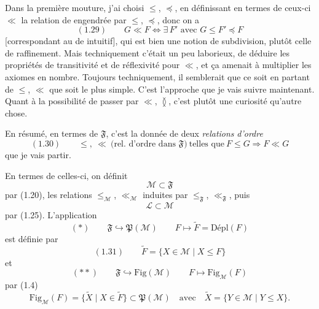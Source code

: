 \documentclass[11pt,a4paper]{article}
\begin{document}
Dans la première mouture, j'ai choisi $\leq$, $\preccurlyeq$, en définissant en termes de ceux-ci $\ll$  la relation de  engendrée par $\leq$, $\preccurlyeq$, donc on a
\[
  (1.29) \qquad G \ll F \iff \exists\, F' \text{ avec } G \leq F' \preccurlyeq F
\]
[correspondant au  de \ill{} \add{\ill{}} \struck{\ill{}} intuitif], qui est bien une notion de subdivision, plutôt \ill{} celle de raffinement. Mais techniquement c'était un peu laborieux, de déduire les propriétés de transitivité et  de réflexivité pour $\ll$, et ça amenait à multiplier les axiomes en nombre. Toujours techniquement, il semblerait que ce soit en partant de $\leq$, $\ll$ que soit le plus simple. C'est l'approche que je vais suivre maintenant. Quant à la possibilité de passer par $\ll$, $\between$, c'est plutôt une curiosité qu'autre chose.


En résumé, en termes de $\mathfrak{F}$, c'est la donnée de deux \emph{relations} \emph{d'ordre}
\[
  (1.30) \qquad \boxed{\leq,\ \ll \ \text{(rel.\ d'ordre dans } \mathfrak{F}) \ \text{telles que} \ F \leq G \Rightarrow F \ll G}
\]
que je vais partir.

En termes de celles-ci, on définit 
\[
  \mathcal{M} \subset \mathfrak{F}
\]
par (1.20),  les relations $\leq_{\mathcal{M}}$, $\ll_{\mathcal{M}}$ induites par $\leq_{\mathfrak{F}}$, $\ll_{\mathfrak{F}}$, puis
\[
  \mathcal{L} \subset \mathcal{M}
\]
par (1.25). L'application
\[
  (*) \qquad \mathfrak{F} \hookrightarrow \mathfrak{P}(\mathcal{M}) \qquad F \mapsto \widetilde{F} = \mathrm{Dépl}(F)
\]
est  définie par
\[
  (1.31) \qquad \widetilde{F} = \lbrace X \in \mathcal{M} \mid X \leq F \rbrace
\]
et
\[
  (**) \qquad \mathfrak{F} \hookrightarrow \mathrm{Fig}(\mathcal{M}) \qquad F \mapsto \mathrm{Fig}_{\mathcal{M}}(F)
\]
par (1.4) 
\[
  \mathrm{Fig}_{\mathcal{M}}(F) = \lbrace \widetilde{X} \mid X \in \widetilde{F} \rbrace \subset \mathfrak{P}(\mathcal{M})
  \quad \text{avec} \quad \widetilde{X} = \lbrace Y \in \mathcal{M} \mid Y \leq X \rbrace .
\]
\end{document}
